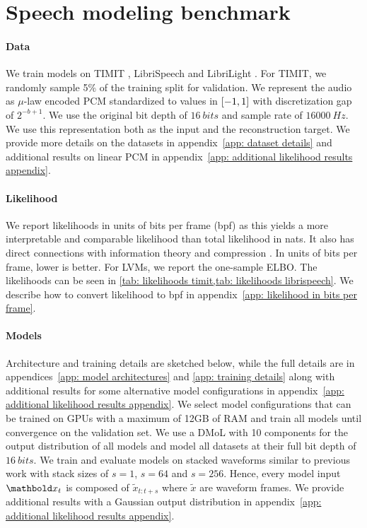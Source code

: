 {\section{Speech modeling benchmark}\label{sec:glvm_benchmark}
\paragraph{Data}
We train models on TIMIT \cite{garofolo_timit_1993}, LibriSpeech \cite{panayotov_librispeech_2015} and LibriLight \cite{kahn_libri-light_2020}. For TIMIT, we randomly sample 5\% of the training split for validation. 
We represent the audio as $\mu$-law encoded PCM standardized to values in ${\left[-1, 1\right]}$ with discretization gap of ${2^{-b+1}}$. We use the original bit depth of $\SI{16}{bits}$ and sample rate of $\SI{16000}{Hz}$. We use this representation both as the input and the reconstruction target. We provide more details on the datasets in appendix~\cref{app: dataset details} and additional results on linear PCM in appendix~\cref{app: additional likelihood results appendix}.
%
\paragraph{Likelihood}
We report likelihoods in units of bits per frame (bpf) as this yields a more interpretable and comparable likelihood than total likelihood in nats. It also has direct connections with information theory and compression \cite{shannon_mathematical_1948, townsend_practical_2019}. In units of bits per frame, lower is better. For LVMs, we report the one-sample ELBO. The likelihoods can be seen in \cref{tab: likelihoods timit,tab: likelihoods librispeech}. We describe how to convert likelihood to bpf in appendix~\cref{app: likelihood in bits per frame}.
%
\paragraph{Models}
Architecture and training details are sketched below, while the full details are in appendices~\cref{app: model architectures} and \cref{app: training details} along with additional results for some alternative model configurations in appendix~\cref{app: additional likelihood results appendix}.
We select model configurations that can be trained on GPUs with a maximum of 12GB of RAM and train all models until convergence on the validation set.
We use a DMoL with 10 components for the output distribution of all models and model all datasets at their full bit depth of $\SI{16}{bits}$. We train and evaluate models on stacked waveforms similar to previous work \cite{chung_recurrent_2015, fraccaro_sequential_2016, aksan_stcn_2019} with stack sizes of $s=1$, $s=64$ and $s=256$. Hence, every model input $\xb_t$ is composed of $\tilde{x}_{t:t+s}$ where $\tilde{x}$ are waveform frames. We provide additional results with a Gaussian output distribution in appendix~\cref{app: additional likelihood results appendix}. 

}

